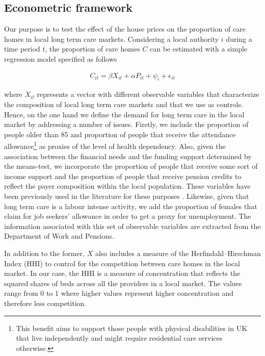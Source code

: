 \documentclass[12pt,letterpaper]{article}
\begin{document}
\subsection{Econometric framework}
\label{sec: specification}

Our purpose is to test the effect of the house prices on the proportion of care homes in local long term care markets.
Considering a local authority $i$ during a time period $t$, the proportion of care homes $C$ can be 
estimated with a simple regression model specified as follows
 
 \begin{eqnarray}
\label{eq: equation1}
   C_{it} = \beta X_{it} + \alpha P_{it} + \psi_{i} + \epsilon_{it}
 \end{eqnarray}

where $X_{it}$ represents a vector with different observable variables
 that characterize the composition of local long term care markets and that we use as controls. Hence, on the one hand
 we define the demand for long
  term care in the local market  by addressing a number of issues. Firstly, we include the proportion 
  of people older than 85 and proportion of people that receive the attendance 
  allowance\footnote{This benefit aims to support those people with physical disabilities in UK that live
   independently and might require residential care services otherwise. } as proxies of the level 
   of health dependency. Also, given the association between the financial needs and the funding
    support determined by the means-test, we incorporate the proportion of people that receive some
     sort of income support and the proportion of people that receive pension credits to reflect the payer 
     composition within the local population. These variables have been previously used in the literature for these purposes 
     \citep{darton2010slicing, forder2014}. Likewise, given that long term care is a labour intense activity,
      we add the proportion of females that claim for job seekers’ allowance in order to get a proxy for unemployment.  
      The information associated with this set of observable variables are 
      extracted from the Department of Work and Pensions. 
      
      In addition to the former, $X$ also includes a measure of the Herfindahl–Hirschman Index (HHI) to control for
      the competition between care homes in the local market. In our case, the HHI is a measure of concentration that 
      reflects the squared shares of beds across all the providers in a local market. The values range from
       0 to 1 where higher values represent higher concentration and therefore less competition. 
       
\end{document}
